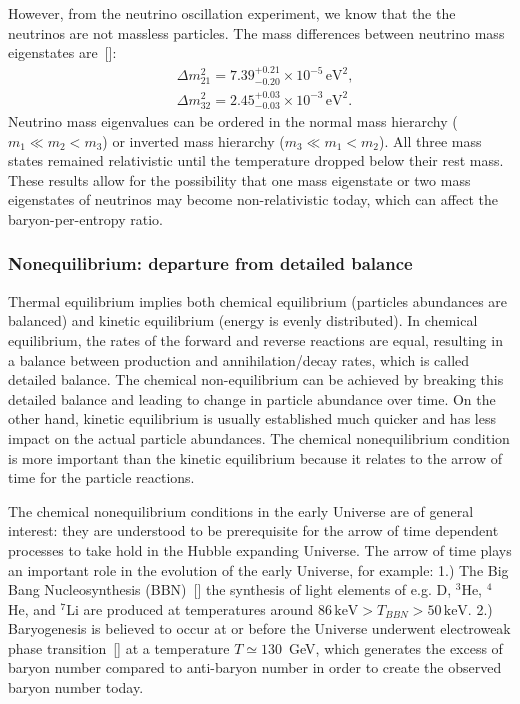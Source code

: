 However, from the neutrino oscillation experiment, we know that the the neutrinos are not massless particles. 
The mass differences between neutrino mass eigenstates are~[\cite{ParticleDataGroup:2022pth}]:
\begin{align}
&\Delta{m}_{21}^2=7.39^{+0.21}_{-0.20}\times10^{-5}\,\mathrm{eV}^2,\\
&\Delta{m}_{32}^2=2.45^{+0.03}_{-0.03}\times10^{-3}\,\mathrm{eV}^2.
\end{align}
Neutrino mass eigenvalues can be ordered in the normal mass hierarchy ($m_1\ll m_2<m_3$) or inverted mass hierarchy ($m_3\ll m_1<m_2$). All three mass states remained relativistic until the temperature dropped below their rest mass. These results allow for the possibility that one mass eigenstate or two mass eigenstates of neutrinos may become non-relativistic today, which can affect the baryon-per-entropy ratio.







\subsubsection{Nonequilibrium: departure from detailed balance}
Thermal equilibrium implies both chemical equilibrium (particles abundances are balanced) and kinetic equilibrium (energy is evenly distributed). In chemical equilibrium, the rates of the forward and reverse reactions are equal, resulting in a balance between production and annihilation/decay rates, which is called detailed balance. The chemical non-equilibrium can be achieved by breaking this detailed balance and leading to change in particle abundance over time. On the other hand, kinetic equilibrium is usually established much quicker and has less impact on the actual particle abundances.
The chemical nonequilibrium condition is more important than the kinetic equilibrium because it relates to the arrow of time for the particle reactions. 

The chemical nonequilibrium conditions in the early Universe are of general interest: they are understood to be prerequisite for the arrow of time dependent processes to take hold in the Hubble expanding Universe. The arrow of time plays an important role in the evolution of the early Universe, for example:
 1.) The Big Bang Nucleosynthesis (BBN)~[\cite{Pitrou:2018cgg,Kolb:1990vq,Dodelson:2003ft,Mukhanov:2005sc}]  the synthesis of light elements of  e.g. D, $^3$He, $^4$He, and $^7$Li are produced at temperatures around $86\,\mathrm{keV}>T_{BBN}>50\,\mathrm{keV}$. 
 2.) Baryogenesis is believed to occur at or before the Universe underwent electroweak phase transition~[\cite{Kolb:1990vq}] at a temperature $T\simeq 130$\, GeV, which generates the excess of baryon number compared to anti-baryon number in order to create the observed baryon number today.

